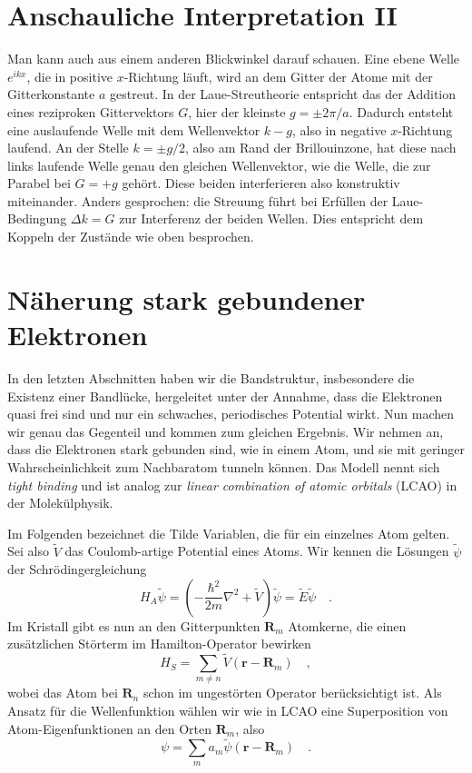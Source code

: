 \section*{Anschauliche Interpretation II}

Man kann auch aus einem anderen Blickwinkel darauf schauen. Eine ebene Welle $e^{i k x}$, die in positive $x$-Richtung läuft, wird an dem Gitter der Atome mit der Gitterkonstante $a$ gestreut.  In der Laue-Streutheorie entspricht das der Addition eines reziproken Gittervektors $G$, hier der kleinste $g = \pm 2 \pi /a$. Dadurch entsteht eine auslaufende Welle mit dem Wellenvektor $k - g$, also in negative $x$-Richtung laufend.  An der Stelle $k = \pm g/2$, also am Rand der Brillouinzone, hat diese nach links laufende Welle genau den gleichen Wellenvektor, wie die Welle, die zur Parabel bei $G=+g$ gehört. Diese beiden interferieren also konstruktiv miteinander. Anders gesprochen: die Streuung führt bei Erfüllen der Laue-Bedingung $\Delta k = G$ zur Interferenz der beiden Wellen. Dies entspricht dem Koppeln der Zustände wie oben besprochen.


\section*{Näherung stark gebundener Elektronen}

In den letzten Abschnitten haben wir die Bandstruktur, insbesondere die Existenz einer Bandlücke, hergeleitet unter der Annahme, dass die Elektronen quasi frei sind und nur ein schwaches, periodisches Potential wirkt. Nun machen wir genau das Gegenteil und kommen zum gleichen Ergebnis. Wir nehmen an, dass die Elektronen stark gebunden sind, wie in einem Atom, und sie mit geringer Wahrscheinlichkeit zum Nachbaratom tunneln können. Das Modell nennt sich \emph{tight binding} und ist analog zur \emph{linear combination of atomic orbitals} (LCAO) in der Molekülphysik.

Im Folgenden bezeichnet die Tilde Variablen, die für ein einzelnes Atom gelten. Sei also $\tilde{V}$ das Coulomb-artige Potential eines Atoms. Wir kennen die Lösungen $\tilde{\psi}$ der Schrödingergleichung
\begin{equation}
    H_A \tilde{\psi}  = \left( - \frac{\hbar^2}{2m} \nabla^2 + \tilde{V} \right) \tilde{\psi} = \tilde{E} \tilde{\psi} \quad .
\end{equation}
Im Kristall gibt es nun an den Gitterpunkten $\mathbf{R}_m$ Atomkerne, die einen zusätzlichen Störterm im Hamilton-Operator bewirken
\begin{equation}
    H_S = \sum_{m \neq n} \tilde{V}(\mathbf{r} - \mathbf{R}_m) \quad ,
\end{equation}
wobei das Atom bei $\mathbf{R}_n$ schon im ungestörten Operator berücksichtigt ist. Als Ansatz für die Wellenfunktion wählen wir wie in LCAO eine Superposition von Atom-Eigenfunktionen an den Orten $\mathbf{R}_m$, also
\begin{equation}
    \psi = \sum_m a_m \tilde{\psi} (\mathbf{r} - \mathbf{R}_m) \quad .
\end{equation}

